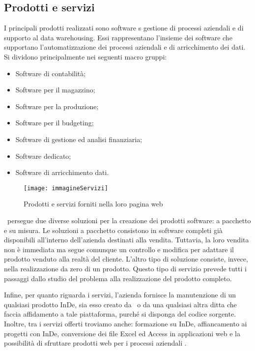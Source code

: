 \subsection{Prodotti e servizi}
\label{cap1:Prodotti e servizi}
I principali prodotti realizzati sono software s gestione di processi aziendali e di supporto al data warehousing. Essi rappresentano l'insieme dei software che supportano l'automatizzazione dei processi aziendali e di arricchimento dei dati. Si dividono principalmente nei seguenti macro gruppi\cite{[2]}:
\begin{itemize}
	\item Software di contabilità;
	\item Software per il magazzino;
	\item Software per la produzione;
	\item Software per il budgeting;
	\item Software di gestione ed analisi finanziaria;
	\item Software dedicato;
	\item Software di arricchimento dati.
\end{itemize}

\begin{figure}[!h] 
	\centering 
	\texttt{[image: immagineServizi]} 
	\caption{Prodotti e servizi forniti nella loro pagina web}
\end{figure}

\azienda\ persegue due diverse soluzioni per la creazione dei prodotti software: a pacchetto e su misura. Le soluzioni a pacchetto consistono in software completi già disponibili all'interno dell'azienda destinati alla vendita. Tuttavia, la loro vendita non è immediata ma segue comunque un controllo e modifica per adattare il prodotto venduto alla realtà del cliente. L'altro tipo di soluzione consiste, invece, nella realizzazione da zero di un prodotto. Questo tipo di servizio prevede tutti i passaggi dallo studio del problema alla realizzazione del prodotto completo.

Infine, per quanto riguarda i servizi, l'azienda fornisce la manutenzione di un qualsiasi prodotto InDe, sia esso creato da \azienda\ o da una qualsiasi altra ditta che faccia affidamento a tale piattaforma, purché si disponga del codice sorgente. Inoltre, tra i servizi offerti troviamo anche: formazione su InDe, affiancamento ai progetti con InDe, conversione dei file Excel ed Access in applicazioni web e la possibilità di sfruttare prodotti web per i processi aziendali \cite{[1]}.



